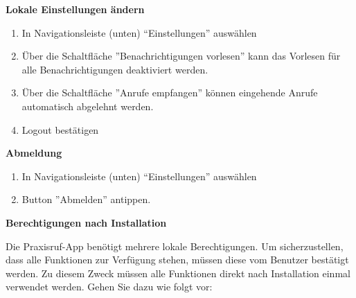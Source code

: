 \textbf{Lokale Einstellungen ändern}
\begin{enumerate}
    \item In Navigationsleiste (unten) ``Einstellungen'' auswählen
    \item Über die Schaltfläche ''Benachrichtigungen vorlesen'' kann das Vorlesen für alle Benachrichtigungen deaktiviert werden.
    \item Über die Schaltfläche ''Anrufe empfangen'' können eingehende Anrufe automatisch abgelehnt werden.
    \item Logout bestätigen
\end{enumerate}

\textbf{Abmeldung}

\begin{enumerate}
    \item In Navigationsleiste (unten) ``Einstellungen'' auswählen
    \item Button ''Abmelden'' antippen.
\end{enumerate}

\textbf{Berechtigungen nach Installation}

Die Praxisruf-App benötigt mehrere lokale Berechtigungen.
Um sicherzustellen, dass alle Funktionen zur Verfügung stehen, müssen diese vom Benutzer bestätigt werden.
Zu diesem Zweck müssen alle Funktionen direkt nach Installation einmal verwendet werden.
Gehen Sie dazu wie folgt vor:

